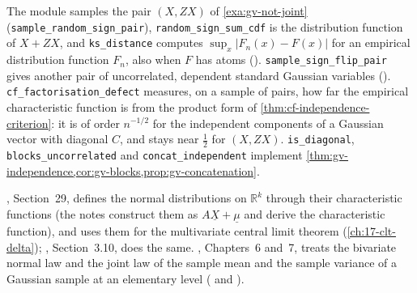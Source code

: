 \begin{remark}[computational]\label{rem:gv-code-independence}
The module  samples the pair $(X,ZX)$ of
\cref{exa:gv-not-joint} (\texttt{sample\_random\_sign\_pair}), \texttt{random\_sign\_sum\_cdf} is the distribution function
of $X+ZX$, and \texttt{ks\_distance} computes $\sup_x|F_n(x)-F(x)|$ for an empirical distribution
function $F_n$, also when $F$ has atoms (). \texttt{sample\_sign\_flip\_pair}
gives another pair of uncorrelated, dependent standard Gaussian variables
(). \texttt{cf\_factorisation\_defect} measures, on a sample of pairs, how far
the empirical characteristic function is from the product form of
\cref{thm:cf-independence-criterion}: it is of order $n^{-1/2}$ for the independent components of
a Gaussian vector with diagonal $C$, and stays near $\frac12$ for $(X,ZX)$. \texttt{is\_diagonal},
\texttt{blocks\_uncorrelated} and \texttt{concat\_independent} implement
\cref{thm:gv-independence,cor:gv-blocks,prop:gv-concatenation}.
\end{remark}


\furtherreading
\textcite{billingsley}, Section~29, defines the normal distributions on $\mathbb R^k$ through their
characteristic functions (the notes construct them as $A\underline X+\underline\mu$ and
derive the characteristic function), and uses them for the multivariate central limit theorem
(\cref{ch:17-clt-delta}); \textcite{durrett}, Section~3.10, does the same. \textcite{ross-5},
Chapters~6 and~7, treats the bivariate normal law and the joint law of the sample mean and the
sample variance of a Gaussian sample at an elementary level ( and
).
